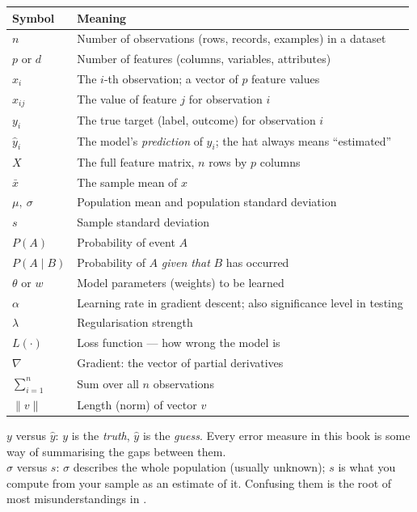 \begin{longtable}{@{}L{2.6cm}L{12.6cm}@{}}
\toprule
{}
\textbf{Symbol} & \textbf{Meaning} \\
\midrule
\endhead
$n$ & Number of observations (rows, records, examples) in a dataset \\
$p$ or $d$ & Number of features (columns, variables, attributes) \\
$x_i$ & The $i$-th observation; a vector of $p$ feature values \\
$x_{ij}$ & The value of feature $j$ for observation $i$ \\
$y_i$ & The true target (label, outcome) for observation $i$ \\
$\hat{y}_i$ & The model's \emph{prediction} of $y_i$; the hat always means ``estimated'' \\
$X$ & The full feature matrix, $n$ rows by $p$ columns \\
$\bar{x}$ & The sample mean of $x$ \\
$\mu,\ \sigma$ & Population mean and population standard deviation \\
$s$ & Sample standard deviation \\
$P(A)$ & Probability of event $A$ \\
$P(A \mid B)$ & Probability of $A$ \emph{given that} $B$ has occurred \\
$\theta$ or $w$ & Model parameters (weights) to be learned \\
$\alpha$ & Learning rate in gradient descent; also significance level in testing \\
$\lambda$ & Regularisation strength \\
$L(\cdot)$ & Loss function --- how wrong the model is \\
$\nabla$ & Gradient: the vector of partial derivatives \\
$\sum_{i=1}^{n}$ & Sum over all $n$ observations \\
$\|v\|$ & Length (norm) of vector $v$ \\
\bottomrule
\end{longtable}

\begin{alertbox}
$y$ versus $\hat{y}$: $y$ is the \emph{truth}, $\hat{y}$ is the \emph{guess}. Every
error measure in this book is some way of summarising the gaps between them.\\[3pt]
$\sigma$ versus $s$: $\sigma$ describes the whole population (usually unknown);
$s$ is what you compute from your sample as an estimate of it. Confusing them is
the root of most misunderstandings in .
\end{alertbox}

